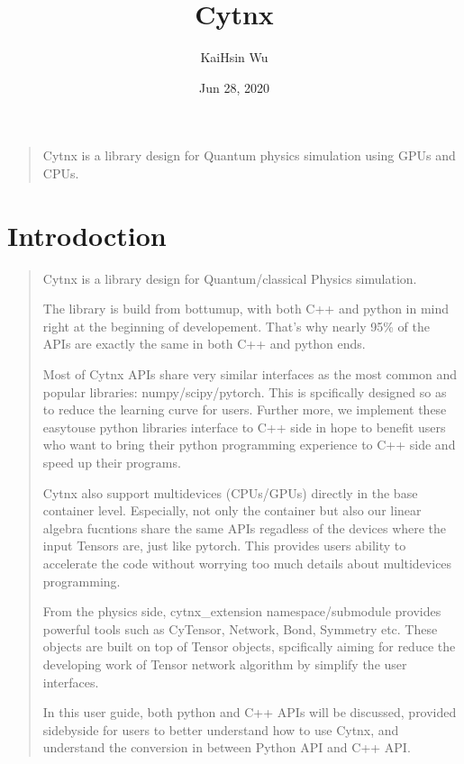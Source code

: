 \documentclass[letterpaper,10pt,english]{sphinxmanual}
\title{Cytnx}
\date{Jun 28, 2020}
\author{Kai\sphinxhyphen{}Hsin Wu}
\let\sphinxpxdimen\pdfpxdimen\else\newdimen\sphinxpxdimen
\begin{document}
\pagestyle{empty}
\sphinxmaketitle
\pagestyle{plain}
\sphinxtableofcontents
\pagestyle{normal}
\label{\detokenize{index::doc}}
\noindent\sphinxincludegraphics[width=350\sphinxpxdimen]{{Icon_small}.png}


\begin{quote}

Cytnx is a library design for Quantum physics simulation using GPUs and CPUs.
\end{quote}


\chapter{Introdoction}
\label{\detokenize{Intro:introdoction}}\label{\detokenize{Intro::doc}}\begin{quote}

Cytnx is a library design for Quantum/classical Physics simulation.

The library is build from bottum\sphinxhyphen{}up, with both C++ and python in mind right at the beginning of developement. That’s why nearly 95\% of the APIs are exactly the same in both C++ and python ends.

Most of Cytnx APIs share very similar interfaces as the most common and popular libraries: numpy/scipy/pytorch. This is spcifically designed so as to reduce the learning curve for users. Further more, we implement these easy\sphinxhyphen{}to\sphinxhyphen{}use python libraries interface to C++ side in hope to benefit users who want to bring their python programming experience to C++ side and speed up their programs.

Cytnx also support multi\sphinxhyphen{}devices (CPUs/GPUs) directly in the base container level. Especially, not only the container but also our linear algebra fucntions share the same APIs regadless of the devices where the input Tensors are, just like pytorch. This provides users ability to accelerate the code without worrying too much details about multi\sphinxhyphen{}devices programming.

From the physics side, cytnx\_extension namespace/submodule provides powerful tools such as CyTensor, Network, Bond, Symmetry etc. These objects are built on top of Tensor objects, spcifically aiming for reduce the developing work of Tensor network algorithm by simplify the user interfaces.

In this user guide, both python and C++ APIs will be discussed, provided side\sphinxhyphen{}by\sphinxhyphen{}side for users to better understand how to use Cytnx, and understand the conversion in between Python API and C++ API.
\end{quote}
\end{document}
